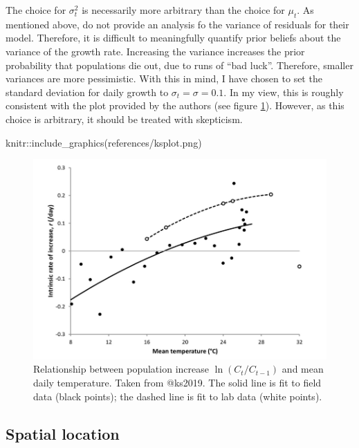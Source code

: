 \documentclass[
  oneside]{book}
\newenvironment{Shaded}{\begin{snugshade}}{\end{snugshade}}
\newcommand{\FunctionTok}[1]{\textcolor[rgb]{0.00,0.00,0.00}{#1}}
\newcommand{\NormalTok}[1]{#1}
\newcommand{\SpecialCharTok}[1]{\textcolor[rgb]{0.00,0.00,0.00}{#1}}
\newcommand{\StringTok}[1]{\textcolor[rgb]{0.31,0.60,0.02}{#1}}
\begin{document}
The choice for \(\sigma^2_t\) is necessarily more arbitrary than the choice for \(\mu_t\). As mentioned above, \citet{ks2019} do not provide an analysis fo the variance of residuals for their model. Therefore, it is difficult to meaningfully quantify prior beliefs about the variance of the growth rate. Increasing the variance increases the prior probability that populations die out, due to runs of ``bad luck''. Therefore, smaller variances are more pessimistic. With this in mind, I have chosen to set the standard deviation for daily growth to \(\sigma_t = \sigma = 0.1\). In my view, this is roughly consistent with the plot provided by the authors (see figure \ref{fig:ksplot}). However, as this choice is arbitrary, it should be treated with skepticism.

\begin{Shaded}
\begin{Highlighting}[]
\NormalTok{knitr}\SpecialCharTok{::}\FunctionTok{include\_graphics}\NormalTok{(}\StringTok{\textquotesingle{}references/ksplot.png\textquotesingle{}}\NormalTok{)}
\end{Highlighting}
\end{Shaded}

\begin{figure}
\includegraphics[width=0.75\linewidth]{references/ksplot} \caption{Relationship between population increase $\ln (C_t / C_{t-1})$ and mean daily temperature. Taken from @ks2019. The solid line is fit to field data (black points); the dashed line is fit to lab data (white points).}\label{fig:ksplot}
\end{figure}

\hypertarget{spatial-location}{%
\subsection{Spatial location}\label{spatial-location}}
\end{document}
